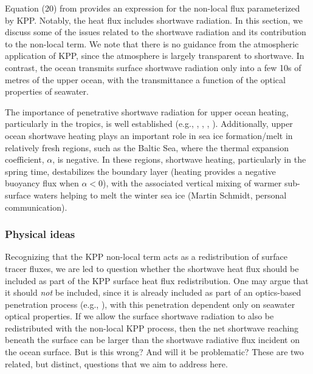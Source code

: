 Equation (20) from \cite{LargeKPP} provides an expression for the
non-local flux parameterized by KPP.  Notably, the heat flux includes
shortwave radiation.  In this section, we discuss some of the issues
related to the shortwave radiation and its contribution to the
non-local term.  We note that there is no guidance from the
atmospheric application of KPP, since the atmosphere is largely
transparent to shortwave.  In contrast, the ocean transmits surface
shortwave radiation only into a few 10s of metres of the upper ocean,
with the transmittance a function of the optical properties of
seawater.

The importance of penetrative shortwave radiation for upper ocean
heating, particularly in the tropics, is well established (e.g.,
\cite{Sweeneyetal}, \cite{Manizza_etal2005},
\cite{Anderson_color_etal2007}, \cite{Anderson_color_etal2009}).
Additionally, upper ocean shortwave heating plays an important role in
sea ice formation/melt in relatively fresh regions, such as the Baltic
Sea, where the thermal expansion coefficient, $\alpha$, is negative.
In these regions, shortwave heating, particularly in the spring time,
destabilizes the boundary layer (heating provides a negative buoyancy
flux when $\alpha < 0$), with the associated vertical mixing of warmer
sub-surface waters helping to melt the winter sea ice (Martin Schmidt,
personal communication).


\subsubsection{Physical ideas}
\label{subsubsection:shortwave-physics}

Recognizing that the KPP non-local term acts as a redistribution of
surface tracer fluxes, we are led to question whether the shortwave
heat flux should be included as part of the KPP surface heat flux
redistribution.  One may argue that it should {\it not} be included,
since it is already included as part of an optics-based penetration
process (e.g., \cite{Manizza_etal2005}), with this penetration
dependent only on seawater optical properties.  If we allow the
surface shortwave radiation to also be redistributed with the
non-local KPP process, then the net shortwave reaching beneath the
surface can be larger than the shortwave radiative flux incident on
the ocean surface.  But is this wrong?  And will it be problematic?
These are two related, but distinct, questions that we aim to address
here.


